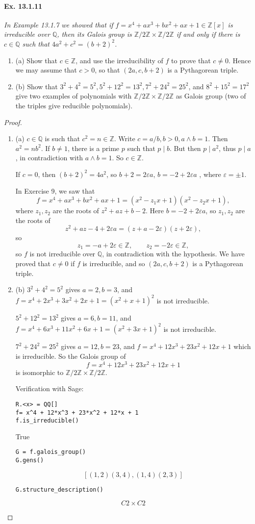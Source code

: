 \documentclass[11pt,a4paper]{article}
\newcommand{\be} {\begin{enumerate}}
\newcommand{\ee} {\end{enumerate}}
\newcommand{\Q}{\mathbb{Q}}
\newcommand{\Z}{\mathbb{Z}}
\begin{document}
\paragraph{Ex. 13.1.11}

{\it In Example 13.1.7 we showed that if $f=x^4+ax^3+bx^2+ax+1 \in \Z[x]$ is irreducible over $\Q$, then its Galois group is $\Z/2\Z \times \Z/2\Z$ if and only if there is $c \in \Q$ such that $4a^2+c^2 = (b+2)^2$.
\be
\item[(a)] Show that $c\in \Z$, and use the irreducibility of $f$ to prove that $c\ne 0$. Hence we may assume that $c>0$, so that $(2a,c,b+2)$ is a Pythagorean triple.
\item[(b)] Show that $3^2+4^2 = 5^2, 5^2+12^2 = 13^2, 7^2 + 24^2 = 25^2$, and $8^2 + 15^2 = 17^2$ give two examples of polynomials with $\Z/2\Z \times \Z/2\Z$ as Galois group (two of the triples give reducible polynomials).
\ee
}

\begin{proof}
\be
\item[(a)]  $c \in \Q$ is such that $c^2 = n \in \Z$. Write $c =a/b, b>0, a\wedge b = 1$. Then $a^2 = n b^2$. If $b\ne 1$, there is a prime $p$ such that $p\mid b$. But then $p\mid a^2$, thus $p\mid a$, in contradiction with $a\wedge b = 1$. So $c \in \Z$.

If $c = 0$, then $(b+2)^2 = 4a^2$, so $b+2 =   2\varepsilon a$, $ b = -2+ 2 \varepsilon a$ , where $\varepsilon = \pm 1$.

In Exercise 9, we saw that
$$f=  x^4+ax^3+bx^2+ax+1 = (x^2-z_1x+1)(x^2 - z_2x+ 1),$$
where $z_1,z_2$  are the roots of $ z^2+az+b-2.$
Here $b = -2+2\varepsilon a$, so $z_1,z_2$ are the roots of $$z^2 +az -4+2\varepsilon a = (z+a-2\varepsilon)(z+2\varepsilon),$$
so
$$z_1 = -a+2\varepsilon \in \Z,\qquad  z_2 = -2 \varepsilon \in \Z,$$
so $f$ is not irreducible over $\Q$, in contradiction with the hypothesis.
We have proved that $c\ne 0$ if $f$ is irreducible, and so $(2a,c,b+2)$ is a Pythagorean triple.

\item[(b)] 
$3^2+4^2 = 5^2$ gives $a=2, b =3$, and $f = x^4+2x^3+3x^2+2x+1 = (x^2+x+1)^2$ is not irreducible.

$5^2+12^2 = 13^2$ gives $a=6, b = 11$, and $f =  x^4+6x^3+11x^2+6x+1 = (x^2+3x+1)^2$ is not irreducible.

$7^2 + 24^2 = 25^2$ gives $a=12,b=23$, and $f= x^4 + 12x^3+23x^2+12x+1$ which is irreducible. So the Galois group of 
$$f= x^4 + 12x^3+23x^2+12x+1$$
is isomorphic to $\Z/2\Z \times \Z/2\Z$.

Verification with Sage:
\begin{verbatim}
R.<x> = QQ[]
f= x^4 + 12*x^3 + 23*x^2 + 12*x + 1
f.is_irreducible()
\end{verbatim}
\begin{center}
True
\end{center}
\begin{verbatim}
G = f.galois_group()
G.gens()
\end{verbatim}
$$ [(1,2)(3,4), (1,4)(2,3)]$$
\begin{verbatim}
G.structure_description()
\end{verbatim}
$$C2 \times C2$$
\ee
\end{proof}
\end{document}
